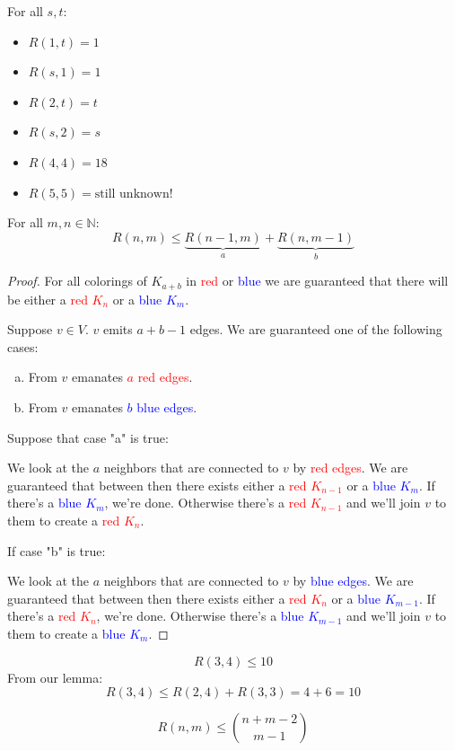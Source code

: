 \documentclass[00_complete]{subfiles}
\begin{document}
For all $s,t$:
\begin{itemize} \tightlist
    \item $R(1,t) = 1$
    \item $R(s,1) = 1$
    \item $R(2,t) = t$
    \item $R(s,2) = s$
    \item $R(4,4) = 18$
    \item $R(5,5) = \text{still unknown!}$
\end{itemize}
\begin{lemma}
    For all $m,n \in \mathbb{N}$:
    $$R(n,m)\leq \underbrace{R(n-1,m)}_{a}+\underbrace{R(n,m-1)}_{b}$$
\end{lemma}
\begin{proof}
    For all colorings of $K_{a+b}$ in \textcolor{red}{red} or
    \textcolor{blue}{blue} we are guaranteed that there will be either a
    \textcolor{red}{red $K_n$} or a \textcolor{blue}{blue $K_m$}.

    Suppose $v \in V$. $v$ emits $a+b-1$ edges. We are guaranteed one of the
    following cases:
    \begin{enumerate}[a.] \tightlist
        \item From $v$ emanates \textcolor{red}{$a$ red edges}.
        \item From $v$ emanates \textcolor{blue}{$b$ blue edges}.
    \end{enumerate}
    Suppose that case "a" is true:

    We look at the $a$ neighbors that are connected to $v$ by
    \textcolor{red}{red edges}. We are guaranteed that between then there
    exists either a \textcolor{red}{red $K_{n-1}$} or a \textcolor{blue}{blue
    $K_m$}. If there's a \textcolor{blue}{blue $K_m$}, we're done. Otherwise
    there's a \textcolor{red}{red $K_{n-1}$} and we'll join $v$ to them to
    create a \textcolor{red}{red $K_{n}$}.

    If case "b" is true:

    We look at the $a$ neighbors that are connected to $v$ by
    \textcolor{blue}{blue edges}. We are guaranteed that between then there
    exists either a \textcolor{red}{red $K_{n}$} or a \textcolor{blue}{blue
    $K_{m-1}$}. If there's a \textcolor{red}{red $K_n$}, we're done. Otherwise
    there's a \textcolor{blue}{blue $K_{m-1}$} and we'll join $v$ to them to
    create a \textcolor{blue}{blue $K_{m}$}.
\end{proof}
\begin{example}
    $$R(3,4) \leq 10$$
    From our lemma:
    $$R(3,4) \leq R(2,4)+R(3,3) = 4+6=10$$
\end{example}
\begin{theorem}
    $$R(n,m) \leq \binom{n+m-2}{m-1}$$
\end{theorem}
\end{document}
